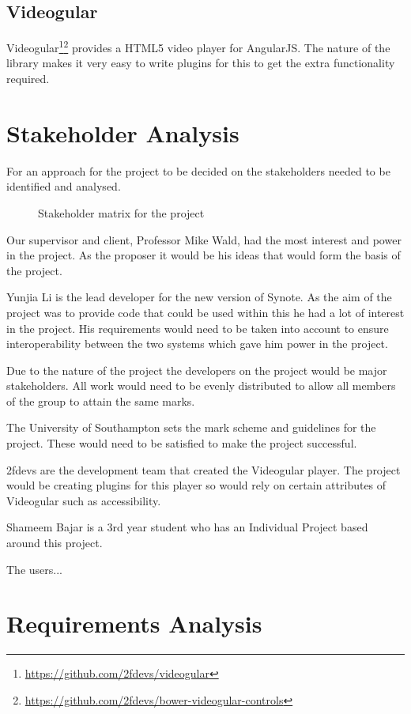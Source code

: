 \subsection{Videogular}
\label{Section:Videogular}
\gls{Videogular}\footnote{\url{https://github.com/2fdevs/videogular}}\footnote{\url{https://github.com/2fdevs/bower-videogular-controls}} provides a HTML5 video player for \gls{AngularJS}. The nature of the library makes it very easy to write plugins for this to get the extra functionality required.

\section{Stakeholder Analysis}
For an approach for the project to be decided on the stakeholders needed to be identified and analysed. 
\begin{figure}[h!]
\centering

\caption{Stakeholder matrix for the project\label{fig:Stakeholder matrix}}
\end{figure}

Our supervisor and client, Professor Mike Wald, had the most interest and power in the project. As the proposer it would be his ideas that would form the basis of the project.

Yunjia Li is the lead developer for the new version of Synote. As the aim of the project was to provide code that could be used within this he had a lot of interest in the project. His requirements would need to be taken into account to ensure interoperability between the two systems which gave him power in the project.

Due to the nature of the project the developers on the project would be major stakeholders. All work would need to be evenly distributed to allow all members of the group to attain the same marks.

The University of Southampton sets the mark scheme and guidelines for the project. These would need to be satisfied to make the project successful.

2fdevs are the development team that created the \gls{Videogular} player. The project would be creating plugins for this player so would rely on certain attributes of \gls{Videogular} such as accessibility. 

Shameem Bajar is a 3rd year student who has an Individual Project based around this project. 

The users... 

\section{Requirements Analysis}
\label{Section:Requirements Analysis}

